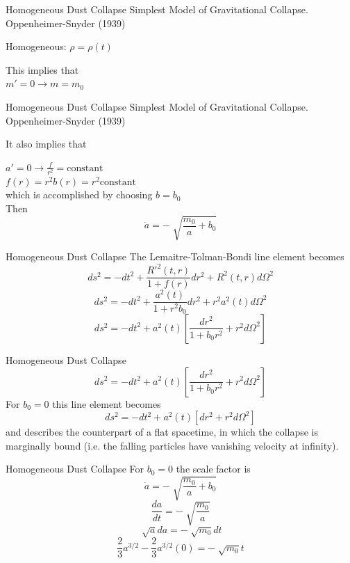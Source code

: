 \documentclass{beamer}
\begin{document}
\begin{darkframes}
\begin{frame}{Homogeneous Dust Collapse}
    Simplest Model of Gravitational Collapse. Oppenheimer-Snyder (1939)\\
    \bigskip 
    
    \pause
    Homogeneous: $\rho = \rho (t)$\\
    \pause
    \bigskip
    
    This implies that \\
    $m'=0 \longrightarrow  m = m_0$\\
\end{frame}

\begin{frame}{Homogeneous Dust Collapse}
    Simplest Model of Gravitational Collapse. Oppenheimer-Snyder (1939)\\
    \bigskip
    
    \pause
    It also implies that\\
    \bigskip
    
    $a'=0 \longrightarrow \frac{f}{r^2}=\textrm{constant}$\\ 
    \pause
    $f(r) = r^2 b(r) = r^2 \textrm{constant}$\\
    \pause
    which is accomplished by choosing $b=b_0$\\
    \pause
  	Then
    $$ \dot{a} = -\sqrt[]{\frac{m_0}{a}+b_0}$$
\end{frame}

\begin{frame}{Homogeneous Dust Collapse}
    The Lemaitre-Tolman-Bondi line element becomes
 	$$ds^2 = -dt^2 + \frac{R'^2(t,r)}{1+f(r)} dr^2 + R^2(t,r) d\Omega^2 $$
    \pause
  	$$ds^2 = -dt^2 + \frac{a^2(t)}{1+r^2 b_0} dr^2 + r^2 a^2(t) d\Omega^2 $$
    \pause
   	$$ds^2 = -dt^2 + a^2(t) \left[ \frac{dr^2}{1+b_0 r^2} + r^2 d\Omega^2 \right] $$
\end{frame}

\begin{frame}{Homogeneous Dust Collapse}
   	$$ds^2 = -dt^2 + a^2(t) \left[ \frac{dr^2}{1+b_0 r^2} + r^2 d\Omega^2 \right] $$
    For $b_0=0$ this line element becomes
    $$ds^2 = -dt^2 + a^2(t) \left[ dr^2 + r^2 d\Omega^2 \right] $$
    and describes the counterpart of a flat spacetime, in which the collapse is marginally bound (i.e. the falling particles have vanishing velocity at infinity).
\end{frame}

\begin{frame}{Homogeneous Dust Collapse}
   	For $b_0 =0$ the scale factor is
    $$ \dot{a} = -\sqrt[]{\frac{m_0}{a}+b_0}$$
    \pause
    $$ \frac{da}{dt} = -\sqrt[]{\frac{m_0}{a}}$$
    \pause
    $$ \sqrt[]{a} da = -\sqrt[]{m_0} dt$$
    \pause
    $$ \frac{2}{3} a^{3/2} - \frac{2}{3} a^{3/2}(0) = -\sqrt[]{m_0} t$$
\end{frame}


\end{darkframes}
\end{document}
